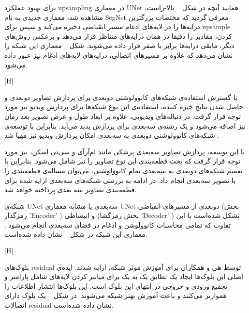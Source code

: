 برای بهبود عملکرد upsampling در معماری UNet همانند آنچه در شکل ~ بالا-راست، مشاهده شد، معماری جدیدی به نام SegNet معرفی گردید  که مختصات بزرگترین درایه‌ها را در لایه‌های ادغام مسیر انقباضی ذخیره می‌کند و سپس برای upsample کردن، مقادیر را دقیقا در همان درایه‌های متناظر قرار می‌دهد و برعکس روش‌های دیگر، مابقی درایه‌ها برابر با صفر قرار داده می‌شوند. شکل ~ معماری این شبکه را نشان می‌دهد که علاوه بر مسیرهای اتصالی، درایه‌های لایه‌های ادغام نیز عبور داده می‌شود.

[H]

با گسترش استفاده‌ی شبکه‌های کانوولوشنی دوبعدی برای پردازش تصاویر دوبعدی و حاصل شدن نتایج خیره کننده، استفاده‌ی این نوع شبکه‌ها برای پردازش ویدیو نیز مورد توجه قرار گرفت. در دنباله‌های ویدیویی، علاوه بر ابعاد طول و عرض تصویر بعد زمان نیز اضافه می‌شود و یک رشته‌ی سه‌بعدی برای پردازش پدید می‌آید. بنابراین با توسعه‌ی شبکه‌های کانوولوشنی دو‌بعدی به سه‌بعدی امکان پردازش ویدیو نیز مهیا شد .

با این توسعه، پردازش تصاویر سه‌بعدی پزشکی مانند ام‌آرآی و سی‌تی اسکن، نیز مورد توجه قرار گرفت که بحث قطعه‌بندی این نوع تصاویر را نیز شامل می‌شود. بنابراین با تعمیم شبکه‌های دوبعدی به سه‌بعدی تمام کانوولوشنی، می‌توان مساله‌ی قطعه‌بندی را با تصویر سه‌بعدی انجام داد. در ادامه به بررسی شبکه‌های سه‌بعدی ارایه شده برای قطعه‌بندی تصاویر سه بعدی پرداخته خواهد شد.

شبکه‌ی UNet سه‌بعدی یا  مشابه معماری UNet دوبعدی از مسیر‌های انقباضی (بخش رمزگذار 'Encoder' ) و انبساطی (بخش رمزگشا 'Decoder' ) تشکل‌ شده‌است با این تفاوت که تمامی محاسبات کانوولوشن و ادغام در فضای سه‌بعدی انجام می‌شود . معماری این شبکه در شکل ~ نشان داده شده‌است.

[H]

بلوک‌های residual توسط هی و همکاران  برای آموزش موثر شبکه، ارایه شدند. ایده‌ی اصلی این بلوک‌ها ایجاد یک تطابق یک‌ به یک برای میانبر کردن لایه‌های شامل پارامتر و تجمیع ورودی و خروجی در انتهای این بلوک است. این بلوک‌ها انتشار اطلاعات را هموارتر می‌کنند و باعث آموزش بهتر شبکه می‌شوند. در شکل ~ یک بلوک دارای اتصالات residual نشان داده شده‌است.

